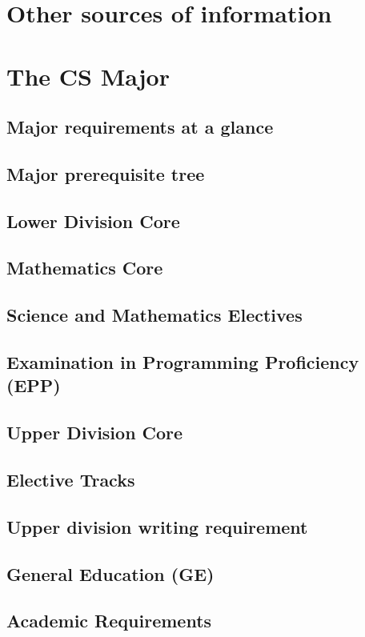 \documentclass{book}
\begin{document}
\chapter{Other sources of information}

\chapter{The CS Major}

\section{Major requirements at a glance}

\section{Major prerequisite tree}

\section{Lower Division Core}
\section{Mathematics Core}
\section{Science and Mathematics Electives}
\section{Examination in Programming Proficiency (EPP)}
\section{Upper Division Core}
\section{Elective Tracks}
\section{Upper division writing requirement}
\section{General Education (GE)}
\section{Academic Requirements}
\end{document}
